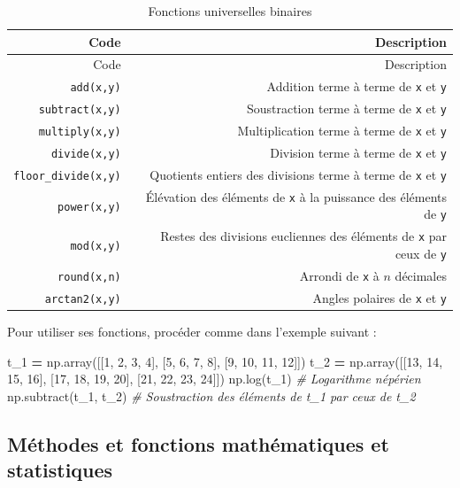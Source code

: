 \documentclass[12pt,]{book}
\newenvironment{Shaded}{\begin{snugshade}}{\end{snugshade}}
\newcommand{\DecValTok}[1]{\textcolor[rgb]{0.00,0.00,0.81}{#1}}
\newcommand{\CommentTok}[1]{\textcolor[rgb]{0.56,0.35,0.01}{\textit{#1}}}
\newcommand{\OperatorTok}[1]{\textcolor[rgb]{0.81,0.36,0.00}{\textbf{#1}}}
\newcommand{\NormalTok}[1]{#1}
\numberwithin{equation}{section}
\numberwithin{countremarque}{section}
\begin{document}
\begin{longtable}[]{@{}rr@{}}
\caption{\label{tab:ufuncs-binaires} Fonctions universelles
binaires}\tabularnewline
\toprule
Code & Description\tabularnewline
\midrule
\endfirsthead
\toprule
Code & Description\tabularnewline
\midrule
\endhead
\texttt{add(x,y)} & Addition terme à terme de \texttt{x} et
\texttt{y}\tabularnewline
\texttt{subtract(x,y)} & Soustraction terme à terme de \texttt{x} et
\texttt{y}\tabularnewline
\texttt{multiply(x,y)} & Multiplication terme à terme de \texttt{x} et
\texttt{y}\tabularnewline
\texttt{divide(x,y)} & Division terme à terme de \texttt{x} et
\texttt{y}\tabularnewline
\texttt{floor\_divide(x,y)} & Quotients entiers des divisions terme à
terme de \texttt{x} et \texttt{y}\tabularnewline
\texttt{power(x,y)} & Élévation des éléments de \texttt{x} à la
puissance des éléments de \texttt{y}\tabularnewline
\texttt{mod(x,y)} & Restes des divisions eucliennes des éléments de
\texttt{x} par ceux de \texttt{y}\tabularnewline
\texttt{round(x,n)} & Arrondi de \texttt{x} à \(n\)
décimales\tabularnewline
\texttt{arctan2(x,y)} & Angles polaires de \texttt{x} et
\texttt{y}\tabularnewline
\bottomrule
\end{longtable}

Pour utiliser ses fonctions, procéder comme dans l'exemple suivant :

\begin{Shaded}
\begin{Highlighting}[]
\NormalTok{t_1 }\OperatorTok{=}\NormalTok{ np.array([[}\DecValTok{1}\NormalTok{, }\DecValTok{2}\NormalTok{, }\DecValTok{3}\NormalTok{, }\DecValTok{4}\NormalTok{], [}\DecValTok{5}\NormalTok{, }\DecValTok{6}\NormalTok{, }\DecValTok{7}\NormalTok{, }\DecValTok{8}\NormalTok{], [}\DecValTok{9}\NormalTok{, }\DecValTok{10}\NormalTok{, }\DecValTok{11}\NormalTok{, }\DecValTok{12}\NormalTok{]])}
\NormalTok{t_2 }\OperatorTok{=}\NormalTok{ np.array([[}\DecValTok{13}\NormalTok{, }\DecValTok{14}\NormalTok{, }\DecValTok{15}\NormalTok{, }\DecValTok{16}\NormalTok{], [}\DecValTok{17}\NormalTok{, }\DecValTok{18}\NormalTok{, }\DecValTok{19}\NormalTok{, }\DecValTok{20}\NormalTok{], [}\DecValTok{21}\NormalTok{, }\DecValTok{22}\NormalTok{, }\DecValTok{23}\NormalTok{, }\DecValTok{24}\NormalTok{]])}
\NormalTok{np.log(t_1) }\CommentTok{# Logarithme népérien}
\NormalTok{np.subtract(t_1, t_2) }\CommentTok{# Soustraction des éléments de t_1 par ceux de t_2}
\end{Highlighting}
\end{Shaded}

\subsection{Méthodes et fonctions mathématiques et
statistiques}\label{methodes-et-fonctions-mathematiques-et-statistiques}
\end{document}
